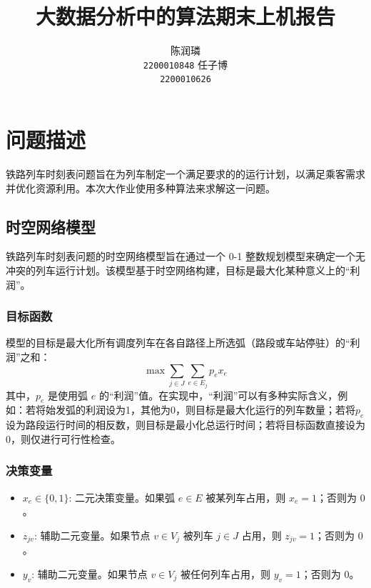 \documentclass{article}
\title{大数据分析中的算法期末上机报告}
\author{
    \large 陈润璘 \\
    \large \texttt{2200010848}
    \And
    \large 任子博 \\
    \large \texttt{2200010626}
}
\begin{document}
\maketitle

\section{问题描述}
铁路列车时刻表问题旨在为列车制定一个满足要求的的运行计划，以满足乘客需求并优化资源利用。本次大作业使用多种算法来求解这一问题。

\subsection{时空网络模型}\label{subsec:spatial-temporal-network-model}

铁路列车时刻表问题的时空网络模型旨在通过一个 0-1 整数规划模型来确定一个无冲突的列车运行计划。该模型基于时空网络构建，目标是最大化某种意义上的“利润”。

\subsubsection{目标函数}
模型的目标是最大化所有调度列车在各自路径上所选弧（路段或车站停驻）的“利润”之和：
\begin{equation}
    \max \sum_{j \in J} \sum_{e \in E_j} p_e x_e\label{eq:obj}
\end{equation}
其中，$p_e$ 是使用弧 $e$
的“利润”值。在实现中，“利润”可以有多种实际含义，例如：若将始发弧的利润设为1，其他为0，则目标是最大化运行的列车数量；若将$p_e$设为路段运行时间的相反数，则目标是最小化总运行时间；若将目标函数直接设为0，则仅进行可行性检查。

\subsubsection{决策变量}
\begin{itemize}
    \item $x_e \in \{0,1\}$: 二元决策变量。如果弧 $e \in E$ 被某列车占用，则 $x_e = 1$；否则为 $0$。
    \item $z_{jv}$: 辅助二元变量。如果节点 $v \in V_j$ 被列车 $j \in J$ 占用，则
        $z_{jv} = 1$；否则为 $0$。
    \item $y_v$: 辅助二元变量。如果节点 $v \in V_j$ 被任何列车占用，则 $y_v = 1$；否则为 $0$。
\end{itemize}
\end{document}
